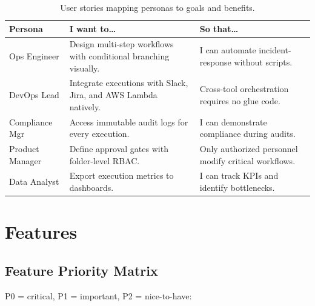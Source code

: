 \documentclass[
    language=english,
    doctype=article,
    institution=none,
]{../../omnilatex}
\begin{document}
\begin{table}[htbp]
    \centering\small
    \begin{tabular}{@{}p{2.4cm}p{4.2cm}p{4.8cm}@{}}
        \toprule
        \textbf{Persona} & \textbf{I want to\dots} & \textbf{So that\dots} \\
        \midrule
        Ops Engineer    & Design multi-step workflows with conditional
            branching visually. &
            I can automate incident-response without scripts. \\
        DevOps Lead     & Integrate executions with Slack, Jira,
            and AWS Lambda natively. &
            Cross-tool orchestration requires no glue code. \\
        Compliance Mgr  & Access immutable audit logs for every execution. &
            I can demonstrate compliance during audits. \\
        Product Manager & Define approval gates with folder-level RBAC. &
            Only authorized personnel modify critical workflows. \\
        Data Analyst    & Export execution metrics to dashboards. &
            I can track KPIs and identify bottlenecks. \\
        \bottomrule
    \end{tabular}
    \caption{User stories mapping personas to goals and benefits.}
    \label{tab:user-stories}
\end{table}

\section{Features}

\subsection{Feature Priority Matrix}

P0 = critical, P1 = important, P2 = nice-to-have:
\end{document}
